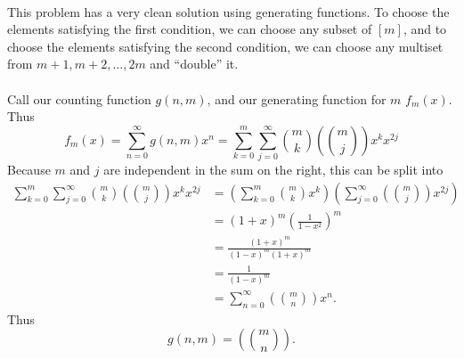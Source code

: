 \documentclass{article}
\newenvironment{solution}[1][Solution.]{\begin{trivlist}
\item[\hskip \labelsep {\bfseries #1}]}{\end{trivlist}}
\begin{document}
\begin{solution} \text{} \\
  This problem has a very clean solution using generating functions. To choose
  the elements
  satisfying the first condition, we can choose any subset of $[m]$, and to
  choose the elements satisfying the second condition, we can choose any
  multiset from ${m+1, m+2, \hdots, 2m}$ and ``double'' it.
  \\~\\
  Call our counting function $g(n, m)$, and our generating function for $m$
  $f_m(x)$.
  Thus \[
    f_m(x)
    = \sum_{n=0}^\infty g(n, m)x^n
    = \sum_{k=0}^m\sum_{j=0}^\infty \binom{m}{k}\left(\!\!\binom{m}{j}\!\!\right)x^kx^{2j}
  \]
  Because $m$ and $j$ are independent in the sum on the right, this can be split
  into \begin{align*}
    \sum_{k=0}^m\sum_{j=0}^\infty \binom{m}{k}\left(\!\!\binom{m}{j}\!\!\right)x^kx^{2j}
    &= \left(\sum_{k=0}^m\binom{m}{k}x^k\right)
       \left(\sum_{j=0}^\infty\left(\!\!\binom{m}{j}\!\!\right)x^{2j}\right) \\
    &= (1 + x)^m\left(\frac{1}{1 - x^2}\right)^m \\
    &= \frac{(1 + x)^m}{(1 - x)^m(1 + x)^m} \\
    &= \frac{1}{(1 - x)^m} \\
    &= \sum_{n=0}^\infty \left(\!\!\binom{m}{n}\!\!\right)x^n.
  \end{align*}
  Thus \[
    g(n, m) = \left(\!\!\binom{m}{n}\!\!\right).
  \]
\end{solution}
\end{document}
